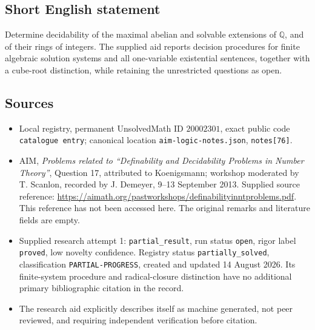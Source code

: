 \documentclass[11pt]{article}
\newcommand{\Q}{\mathbb{Q}}
\begin{document}
\subsection{Short English statement}
Determine decidability of the maximal abelian and solvable extensions of \(\Q\), and of their rings of integers. The supplied aid reports decision procedures for finite algebraic solution systems and all one-variable existential sentences, together with a cube-root distinction, while retaining the unrestricted questions as open.
\subsection{Sources}
\begin{itemize}
\item Local registry, permanent UnsolvedMath ID \(20002301\), exact public code \texttt{catalogue entry}; canonical location \texttt{aim-logic-notes.json}, \texttt{notes[76]}.
\item AIM, \emph{Problems related to ``Definability and Decidability Problems in Number Theory''}, Question 17, attributed to Koenigsmann; workshop moderated by T. Scanlon, recorded by J. Demeyer, 9--13 September 2013. Supplied source reference: \url{https://aimath.org/pastworkshops/definabilityinntproblems.pdf}. This reference has not been accessed here. The original remarks and literature fields are empty.
\item Supplied research attempt 1: \texttt{partial\_result}, run status \texttt{open}, rigor label \texttt{proved}, low novelty confidence. Registry status \texttt{partially\_solved}, classification \texttt{PARTIAL-PROGRESS}, created and updated 14 August 2026. Its finite-system procedure and radical-closure distinction have no additional primary bibliographic citation in the record.
\item The research aid explicitly describes itself as machine generated, not peer reviewed, and requiring independent verification before citation.
\end{itemize}
\end{document}
